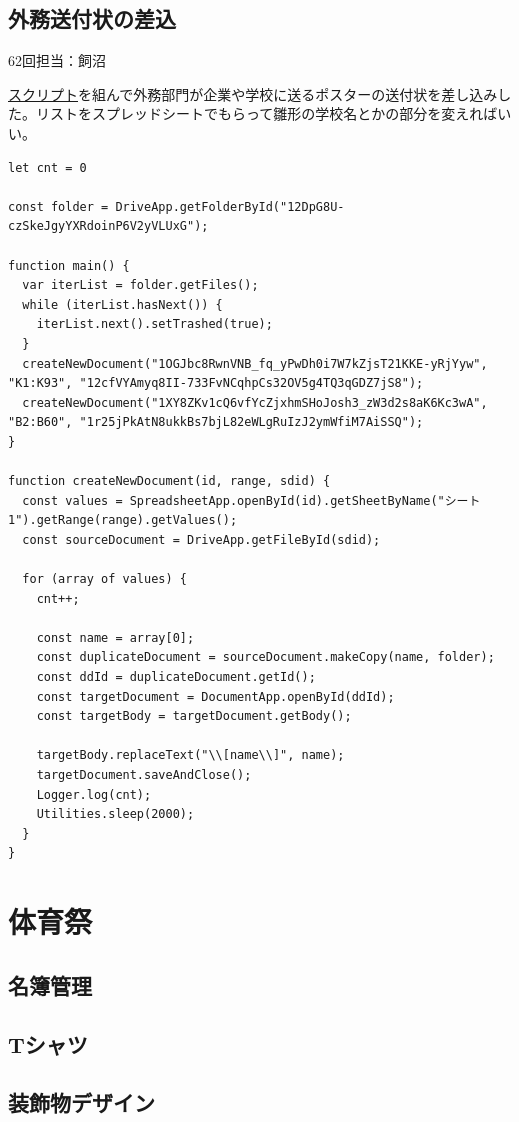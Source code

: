 \documentclass[dvipdfmx,jb5]{jreport}
\newcommand{\Chapter}[1]{\chapter{#1}\thispagestyle{fancy}}
\begin{document}
\section{外務送付状の差込}\label{sec:外務送付状の差込}
62回担当：飼沼

\href{https://script.google.com/d/1peO_Bmf9jcnJWGCZMN2IRhBrCqokkgPmUVuC4BlryH9kxAiHoXzkjO_x/edit?usp=sharing}{スクリプト}を組んで外務部門が企業や学校に送るポスターの送付状を差し込みした。リストをスプレッドシートでもらって雛形の学校名とかの部分を変えればいい。
\lstset{language=JavaScript}
\begin{lstlisting}
let cnt = 0

const folder = DriveApp.getFolderById("12DpG8U-czSkeJgyYXRdoinP6V2yVLUxG");

function main() {
  var iterList = folder.getFiles();
  while (iterList.hasNext()) {
    iterList.next().setTrashed(true);
  }
  createNewDocument("1OGJbc8RwnVNB_fq_yPwDh0i7W7kZjsT21KKE-yRjYyw", "K1:K93", "12cfVYAmyq8II-733FvNCqhpCs32OV5g4TQ3qGDZ7jS8");
  createNewDocument("1XY8ZKv1cQ6vfYcZjxhmSHoJosh3_zW3d2s8aK6Kc3wA", "B2:B60", "1r25jPkAtN8ukkBs7bjL82eWLgRuIzJ2ymWfiM7AiSSQ");
}

function createNewDocument(id, range, sdid) {
  const values = SpreadsheetApp.openById(id).getSheetByName("シート1").getRange(range).getValues();
  const sourceDocument = DriveApp.getFileById(sdid);

  for (array of values) {
    cnt++;

    const name = array[0];
    const duplicateDocument = sourceDocument.makeCopy(name, folder);
    const ddId = duplicateDocument.getId();
    const targetDocument = DocumentApp.openById(ddId);
    const targetBody = targetDocument.getBody();

    targetBody.replaceText("\\[name\\]", name);
    targetDocument.saveAndClose();
    Logger.log(cnt);
    Utilities.sleep(2000);
  }
}
\end{lstlisting}

\Chapter{体育祭}
\section{名簿管理}

\section{Tシャツ}

\section{装飾物デザイン}
\end{document}
